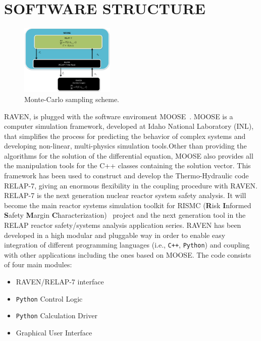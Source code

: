 \documentclass{anstrans}
\begin{document}
\section{SOFTWARE STRUCTURE}
\begin{figure}
\centering
\includegraphics[width=0.4\textwidth]{figures/ControlSystemSoftwareLayout.pdf}
\caption{Monte-Carlo sampling scheme.}
\label{fig:ControlSoftwareLayout}
\end{figure}
RAVEN, is plugged with the software enviroment MOOSE~\cite{MOOSE}. MOOSE is a computer simulation framework,  developed at Idaho National Laboratory (INL), that simplifies the process for predicting the behavior of complex systems and developing non-linear, multi-physics simulation tools.Other than providing the algorithms for the solution of the differential equation, MOOSE also provides all the manipulation tools for the C++ classes containing the solution vector. This framework has been used to construct and develop the Thermo-Hydraulic code RELAP-7, giving an enormous flexibility in the coupling procedure with RAVEN. 
\\ RELAP-7 is the next generation nuclear reactor system safety analysis. It will become the main reactor systems simulation toolkit for RISMC (\textbf{R}isk \textbf{I}nformed \textbf{S}afety \textbf{M}argin \textbf{C}haracterization)~\cite{mandelliANS_RISMC} project and the next generation tool in the RELAP reactor safety/systems analysis application series. 
RAVEN has been developed in a high modular and pluggable way in order to enable easy integration of different programming languages (i.e., \verb!C++!, \verb!Python!) and coupling with other applications including the ones based on MOOSE. The code consists of four main modules:
\begin{itemize}
\item RAVEN/RELAP-7 interface
\item \verb!Python! Control Logic 
\item \verb!Python! Calculation Driver
\item Graphical User Interface 
\end{itemize}
\end{document}
